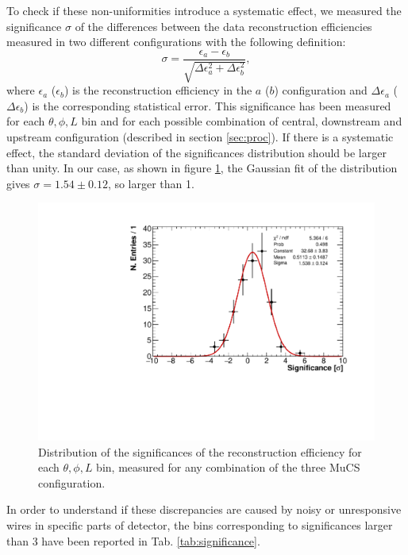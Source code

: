 \documentclass[a4paper]{scrartcl}
\begin{document}
To check if these non-uniformities introduce a systematic effect, we measured the significance $\sigma$ of the differences between the data reconstruction efficiencies measured in two different configurations with the following definition:
\begin{equation}
\sigma = \frac{\epsilon_a-\epsilon_b}{\sqrt{\Delta \epsilon_{a}^2 + \Delta \epsilon_b^2}},
\end{equation}
where $\epsilon_{a}$ ($\epsilon_{b}$) is the reconstruction efficiency in the $a$ ($b$) configuration and $\Delta \epsilon_{a}$ ($\Delta \epsilon_{b}$) is the corresponding statistical error. This significance has been measured for each $\theta,\phi,L$ bin and for each possible combination of central, downstream and upstream configuration (described in section \ref{sec:proc}). If there is a systematic effect, the standard deviation of the significances distribution should be larger than unity. In our case, as shown in figure \ref{fig:significance}, the Gaussian fit of the distribution gives $\sigma = 1.54\pm0.12$, so larger than 1.

\begin{figure}[htbp]
  \begin{center}
    \includegraphics[width=0.7\linewidth]{figures/significance.pdf}
    \caption{Distribution of the significances of the reconstruction efficiency for each $\theta,\phi,L$ bin, measured for any combination of the three MuCS configuration.} \label{fig:significance}
  \end{center}
\end{figure}

In order to understand if these discrepancies are caused by noisy or unresponsive wires in specific parts of detector, the bins corresponding to significances larger than 3 have been reported in Tab. \ref{tab:significance}.
\end{document}
